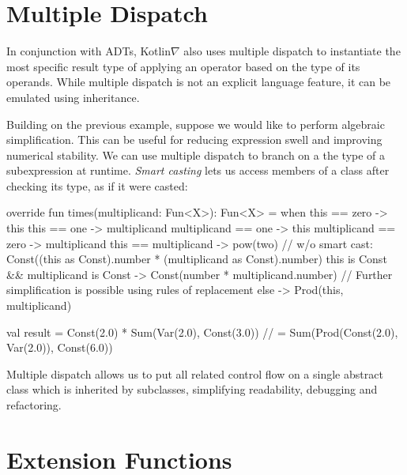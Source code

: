 \documentclass[12pt,initial,twoside,maitrise]{dms}
\numberwithin{equation}{section}
\numberwithin{table}{chapter}
\numberwithin{figure}{chapter}
\begin{document}
\section{Multiple Dispatch}\label{sec:multiple-dispatch}

In conjunction with ADTs, Kotlin$\nabla$ also uses multiple dispatch to instantiate the most specific result type of applying an operator based on the type of its operands. While multiple dispatch is not an explicit language feature, it can be emulated using inheritance.

Building on the previous example, suppose we would like to perform algebraic simplification. This can be useful for reducing expression swell and improving numerical stability. We can use multiple dispatch to branch on a the type of a subexpression at runtime. \textit{Smart casting} lets us access  members of a class after checking its type, as if it were casted:

\begin{kotlinlisting}
override fun times(multiplicand: Fun<X>): Fun<X> =
    when {
        this == zero -> this
        this == one -> multiplicand
        multiplicand == one -> this
        multiplicand == zero -> multiplicand
        this == multiplicand -> pow(two)
        // w/o smart cast: Const((this as Const).number * (multiplicand as Const).number)
        this is Const && multiplicand is Const -> Const(number * multiplicand.number)
        // Further simplification is possible using rules of replacement
        else -> Prod(this, multiplicand)
    }

val result = Const(2.0) * Sum(Var(2.0), Const(3.0))
//         = Sum(Prod(Const(2.0), Var(2.0)), Const(6.0))
\end{kotlinlisting}
%
Multiple dispatch allows us to put all related control flow on a single abstract class which is inherited by subclasses, simplifying readability, debugging and refactoring.

\section{Extension Functions}\label{sec:extension-functions}
\end{document}
